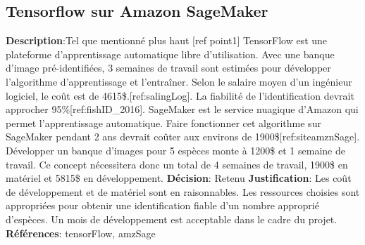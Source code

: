 

\subsection{Tensorflow sur Amazon SageMaker}
\label{s:identifier_conc2}

\textbf{Description}:Tel que mentionné plus haut [ref point1] TensorFlow est une plateforme d’apprentissage automatique libre d’utilisation.  Avec une banque d’image pré-identifiées, 3 semaines de travail sont estimées pour développer l'algorithme d’apprentissage et l’entraîner. Selon le salaire moyen d’un ingénieur logiciel, le coût est de 4615\$.[ref:salingLog].  La fiabilité de l’identification devrait approcher 95\%[ref:fishID_2016]. SageMaker est le service nuagique d’Amazon qui permet l’apprentissage automatique. Faire fonctionner cet algorithme sur SageMaker pendant 2 ans devrait coûter aux environs de 1900\$[ref:siteamznSage]. Développer un banque d’images pour 5 espèces monte à 1200\$ et 1 semaine de travail. Ce concept nécessitera donc un total de 4 semaines de travail, 1900\$ en matériel et 5815\$ en développement.
\textbf{Décision}: Retenu
\textbf{Justification}: Les coût de développement et de matériel sont en raisonnables. Les ressources choisies sont appropriées pour obtenir une identification fiable d’un nombre approprié d’espèces. Un mois de développement est acceptable dans le cadre du projet.
\textbf{Références}: tensorFlow, amzSage